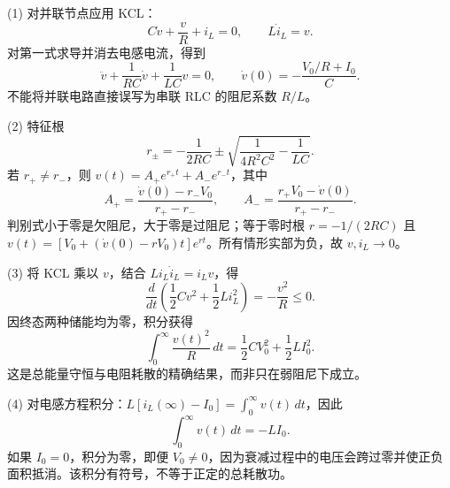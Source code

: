 (1) 对并联节点应用 KCL：
\[
C\dot v+\frac vR+i_L=0,\qquad L\dot i_L=v.
\]
对第一式求导并消去电感电流，得到
\[
\ddot v+\frac1{RC}\dot v+\frac1{LC}v=0,\qquad
\dot v(0)=-\frac{V_0/R+I_0}{C}.
\]
不能将并联电路直接误写为串联 RLC 的阻尼系数 \(R/L\)。

(2) 特征根
\[
r_\pm=-\frac1{2RC}\pm\sqrt{\frac1{4R^2C^2}-\frac1{LC}}.
\]
若 \(r_+\ne r_-\)，则 \(v(t)=A_+e^{r_+t}+A_-e^{r_-t}\)，其中
\[
A_+=\frac{\dot v(0)-r_-V_0}{r_+-r_-},\qquad
A_-=\frac{r_+V_0-\dot v(0)}{r_+-r_-}.
\]
判别式小于零是欠阻尼，大于零是过阻尼；等于零时根 \(r=-1/(2RC)\) 且 \(v(t)=[V_0+(\dot v(0)-rV_0)t]e^{rt}\)。所有情形实部为负，故 \(v,i_L\to0\)。

(3) 将 KCL 乘以 \(v\)，结合 \(L i_L\dot i_L=i_Lv\)，得
\[
\frac d{dt}\left(\frac12Cv^2+\frac12Li_L^2\right)=-\frac{v^2}{R}\le0.
\]
因终态两种储能均为零，积分获得
\[
\int_0^\infty\frac{v(t)^2}{R}\,dt=\frac12C V_0^2+\frac12L I_0^2.
\]
这是总能量守恒与电阻耗散的精确结果，而非只在弱阻尼下成立。

(4) 对电感方程积分：\(L[i_L(\infty)-I_0]=\int_0^\infty v(t)\,dt\)，因此
\[
\int_0^\infty v(t)\,dt=-L I_0.
\]
如果 \(I_0=0\)，积分为零，即便 \(V_0\ne0\)，因为衰减过程中的电压会跨过零并使正负面积抵消。该积分有符号，不等于正定的总耗散功。

